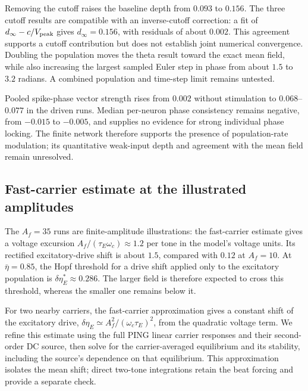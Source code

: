 \documentclass[11pt,a4paper]{article}
\begin{document}
Removing the cutoff raises the baseline depth from $0.093$ to $0.156$.
The three cutoff results are compatible with an inverse-cutoff correction:
a fit of $d_\infty-c/V_{\rm peak}$ gives $d_\infty=0.156$, with residuals
of about $0.002$. This agreement supports a cutoff contribution but does not
establish joint numerical convergence. Doubling the population moves the
theta result toward the exact mean field, while also increasing the largest
sampled Euler step in phase from about $1.5$ to $3.2$ radians. A combined
population and time-step limit remains untested.

Pooled spike-phase vector strength rises from $0.002$ without stimulation
to $0.068$--$0.077$ in the driven runs. Median per-neuron phase consistency
remains negative, from $-0.015$ to $-0.005$, and supplies no evidence for
strong individual phase locking. The finite network therefore supports the
presence of population-rate modulation; its quantitative weak-input depth
and agreement with the mean field remain unresolved.

\fi
\subsection{Fast-carrier estimate at the illustrated amplitudes}\label{app:qif-estimate}
The $A_f=35$ runs are finite-amplitude illustrations: the fast-carrier estimate gives a voltage excursion
$A_f/(\tau_E\omega_c)\approx1.2$ per tone in the model's voltage units. Its
rectified excitatory-drive shift is about $1.5$, compared with $0.12$ at
$A_f=10$. At $\bar\eta=0.85$, the Hopf threshold for a drive shift applied
only to the excitatory population is $\delta\eta_E^*\approx0.286$. The larger
field is therefore expected to cross this threshold, whereas the smaller one
remains below it.

For two nearby carriers, the fast-carrier approximation gives a constant shift
of the excitatory drive, $\delta\eta_E\simeq A_f^2/(\omega_c\tau_E)^2$, from the
quadratic voltage term. We refine this estimate using the full PING linear carrier
responses and their second-order DC source, then solve for the carrier-averaged
equilibrium and its stability, including the source's dependence on that equilibrium.
This approximation isolates the mean shift; direct two-tone integrations retain
the beat forcing and provide a separate check.
\end{document}
